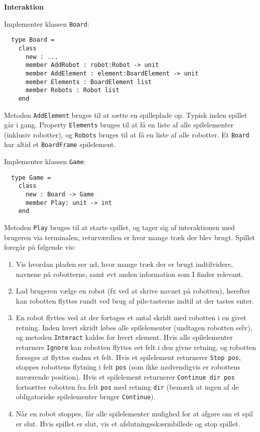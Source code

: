 \textbf{Interaktion}

Implementer klassen \lstinline{Board}:

\begin{lstlisting}
  type Board =
    class
      new : ...
      member AddRobot : robot:Robot -> unit
      member AddElement : element:BoardElement -> unit
      member Elements : BoardElement list
      member Robots : Robot list
    end
\end{lstlisting}

Metoden \lstinline{AddElement} bruges til at sætte en spilleplade
op. Typisk inden spillet går i gang. Property \lstinline{Elements}
bruges til at få en liste af alle spilelementer (inklusiv robotter),
og \lstinline{Robots} bruges til at få en liste af alle robotter. Et
\lstinline{Board} har altid et \lstinline{BoardFrame} spilelement.

Implementer klassen \lstinline{Game}:

\begin{lstlisting}
  type Game =
    class
      new : Board -> Game
      member Play: unit -> int
    end
\end{lstlisting}

Metoden \lstinline{Play} bruges til at starte spillet, og tager sig af
interaktionen med brugeren via terminalen, returværdien er hvor mange
træk der blev brugt. Spillet
foregår på følgende vis:
\begin{enumerate}
 \item Vis hvordan pladen ser ud, hvor mange træk der er brugt
  indtilvidere, navnene på robotterne, samt evt anden information som
  I finder relevant.
\item Lad brugeren vælge en robot (fx ved at skrive navnet på
  robotten), herefter kan robotten flyttes rundt ved brug af
  pile-tasterne indtil at der tastes enter.
\item En robot flyttes ved at der fortages et antal skridt med
  robotten i en givet retning. Inden hvert skridt løbes alle
  spilelementer (undtagen robotten selv), og metoden
  \lstinline{Interact} kaldes for hvert element. Hvis alle
  spilelementer
  returnere \lstinline{Ignore} kan robotten flyttes eet felt i den
  givne retning, og robotten forsøges at flyttes endnu et felt. Hvis
  et spilelement returnerer \lstinline{Stop pos}, stoppes robottens
  flytning i felt \lstinline{pos} (som ikke nødvendigvis er robottens
  nuværende position). Hvis et spilelement returnerer
  \lstinline{Continue dir pos} fortsætter robotten fra felt
  \lstinline{pos} med retning \lstinline{dir} (bemærk at ingen af de
  obligatoriske spilelementer bruger \lstinline{Continue}).

\item Når en robot stoppes, får alle spilelementer mulighed for at
  afgøre om et spil er slut. Hvis spillet er slut, vis et
  afslutningsskærmbillede og stop spillet.
\end{enumerate}

